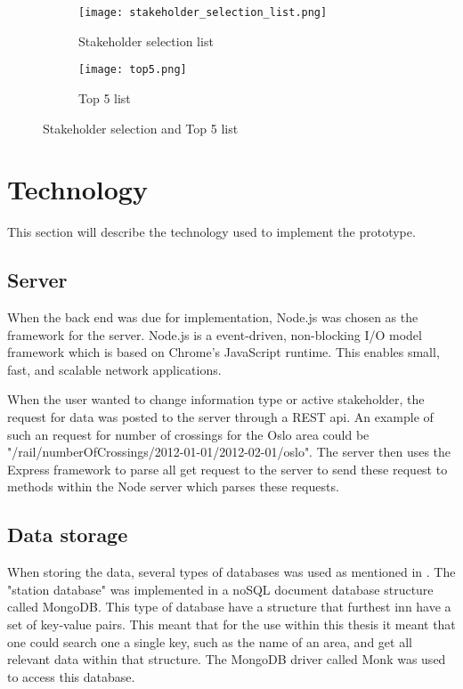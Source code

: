 \begin{figure}[h!tbp]
	\centering
	\begin{subfigure}{0.4\textwidth}
		\texttt{[image: stakeholder\_selection\_list.png]}
		\caption[Stakeholder selection list]{Stakeholder selection list}
		\label{fig:stakeholder_selection_list}
	\end{subfigure}
	\begin{subfigure}{0.4\textwidth}
		\texttt{[image: top5.png]}
		\caption[Top 5 list]{Top 5 list}
		\label{fig:top_5_list}
	\end{subfigure}
	\caption[Stakeholder selection and Top 5 list]{Stakeholder selection and Top 5 list}
	\label{fig:stakeholder_selection_and_Top5_list}
\end{figure}


\section{Technology} %
This section will describe the technology used to implement the prototype.
\label{sec:technology}

\subsection{Server} %
\label{sub:server}
When the back end was due for implementation, Node.js\cite{nodeJs} was chosen 
as the framework for the server. Node.js is a event-driven, non-blocking  I/O
model framework which is based on Chrome's\cite{chromeJavaScriptEngine} 
JavaScript runtime. This enables small, fast, and scalable network
applications.

When the user wanted to change information type or active stakeholder, the
request for data was posted to the server through a REST\cite{REST} api. An
example of such an request for number of crossings for the Oslo area could be
"/rail/numberOfCrossings/2012-01-01/2012-02-01/oslo". The server then uses the
Express\cite{express} framework to parse all get request to the server to send
these request to methods within the Node server which parses these requests.



\subsection{Data storage} %
\label{sub:technology_data_storage}
When storing the data, several types of databases was used as mentioned in
. The "station database" was implemented in
a noSQL document database structure called MongoDB\cite{mongoDB}. This type of
database have a structure that furthest inn have a set of key-value pairs. This
meant that for the use within this thesis it meant that one could search one a
single key, such as the name of an area, and get all relevant data within that
structure. The MongoDB driver called Monk\cite{npmMonk} was used to access this
database.\\

